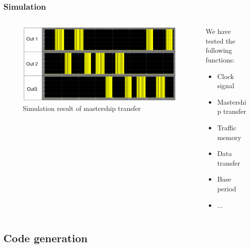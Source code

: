 \documentclass[12pt,beamer]{beamer}
\begin{document}
\begin{frame}
	\frametitle{Simulation}
	\begin{columns}
		\begin{column}{0.5\textwidth}
			\begin{figure}
			\includegraphics[width=\textwidth]{pic/Simulation_Result.pdf}
			\caption{Simulation result of mastership transfer}
			\end{figure}
		\end{column}
	
		\begin{column}{0.5\textwidth}
			We have tested the following functions:
			\begin{itemize}
			\setlength{\itemsep}{10pt}
			\item Clock signal 
			\item Mastership transfer
			\item Traffic memory
			\item Data transfer
			\item Base period
			\item ...
			\end{itemize}
		\end{column}
	\end{columns}
\end{frame}

\subsection{Code generation}

\end{document}
